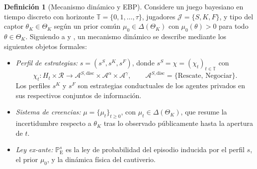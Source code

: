 \documentclass[review,authoryear,12pt]{elsarticle}
\providecommand{\textcite}{\citet}
\theoremstyle{plain}
\theoremstyle{definition}
\newtheorem{definition}[theorem]{Definición}
\newcommand{\ProbE}{\mathbb{P}_{\mathrm{E}}}
\newcommand{\ThetaK}{\Theta_K}
\newcommand{\1}{\mathbf{1}}
\begin{document}
\begin{definition}[Mecanismo dinámico y EBP]
\label{def:pbe-mechanism}
Considere un juego bayesiano en tiempo discreto con horizonte $\mathbb{T}=\{0,1,\ldots,\tau\}$, jugadores $\mathcal{J}=\{S,K,F\}$, y tipo del captor $\theta_K\in\ThetaK$ según un prior común $\mu_0\in\Delta(\ThetaK)$ con $\mu_0(\theta)>0$ para todo $\theta\in\ThetaK$. Siguiendo a \textcite{FudenbergTirole1991} y \textcite{KrepsWilson1982}, un mecanismo dinámico se describe mediante los siguientes objetos formales:

\begin{itemize}
  \item \emph{Perfil de estrategias:} $s=(s^S,s^K,s^F)$, donde $s^S=\chi=(\chi_t)_{t\in\mathbb{T}}$ con
  \[
    \chi_t \colon H_t\times\mathcal{R}
    \longrightarrow \mathcal{A}^{S,\mathrm{disc}}\times\mathcal{A}^{\alpha}\times\mathcal{A}^{\gamma},
    \qquad
    \mathcal{A}^{S,\mathrm{disc}}=\{\text{Rescate},\,\text{Negociar}\}.
  \]
  Los perfiles $s^K$ y $s^F$ son estrategias conductuales de los agentes privados en sus respectivos conjuntos de información.
  \item \emph{Sistema de creencias:} $\mu=\{\mu_t\}_{t\ge 0}$, con $\mu_t\in\Delta(\ThetaK)$, que resume la incertidumbre respecto a $\theta_K$ tras lo observado públicamente hasta la apertura de $t$.
  \item \emph{Ley ex-ante:} $\ProbE^s$ es la ley de probabilidad del episodio inducida por el perfil $s$, el prior $\mu_0$, y la dinámica física del cautiverio.
\end{itemize}


\end{definition}
\end{document}
